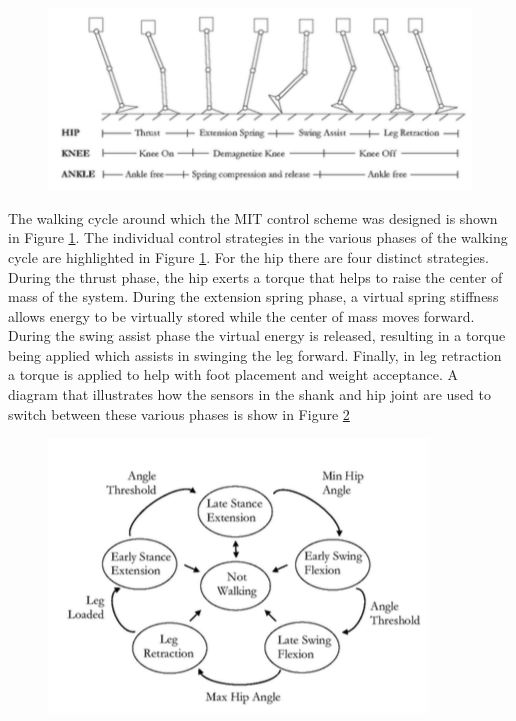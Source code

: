 \begin{figure}[thpb]
\centering
\includegraphics[width=4.in]{exos/figs/MIT/walkingCycle}
  \caption{}
  \vspace{-0.2in}
 \label{fig:walkingCycle} 
 \end{figure} 
The walking cycle around which the MIT control scheme was designed is shown in Figure \ref{fig:walkingCycle}.  The individual control strategies in the various phases of the walking cycle are highlighted in Figure \ref{fig:walkingCycle}.  For the hip there are four distinct strategies.  During the thrust phase, the hip exerts a torque that helps to raise the center of mass of the system.  During the extension spring phase, a virtual spring stiffness allows energy to be virtually stored while the center of mass moves forward.  During the swing assist phase the virtual energy is released, resulting in a torque being applied which assists in swinging the leg forward.  Finally, in leg retraction a torque is applied to help with foot placement and weight acceptance.  A diagram that illustrates how the sensors in the shank and hip joint are used to switch between these various phases is show in Figure \ref{fig:hipControl} 
 \begin{figure}[thpb]
\centering
\includegraphics[width=3.in]{exos/figs/MIT/hipControl}
  \caption{}
  \vspace{-0.2in}
 \label{fig:hipControl} 
 \end{figure}  
 

